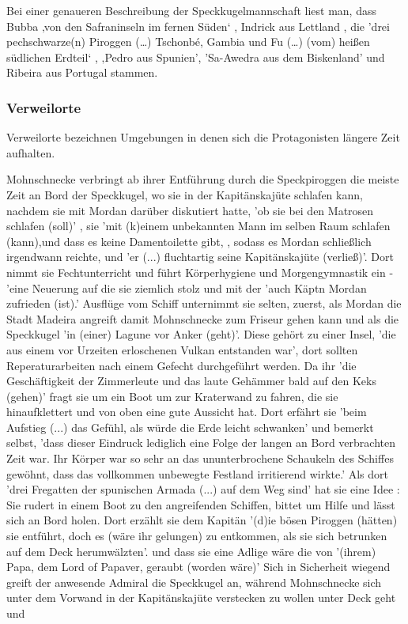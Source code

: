 Bei einer genaueren Beschreibung der Speckkugelmannschaft liest man, dass Bubba ‚von den Safraninseln im fernen Süden‘ \cite[S.46]{pir}, Indrick aus Lettland \cite[S.46f]{pir}, die 'drei pechschwarze(n) Piroggen (…) Tschonbé, Gambia und Fu (…) (vom) heißen südlichen Erdteil‘ \cite[S.47]{pir}, ‚Pedro aus Spunien'\cite[S.47]{pir}, 'Sa-Awedra aus dem Biskenland' \cite[S.47]{pir} und Ribeira aus Portugal \cite[S.47]{pir} stammen.


\subsubsection{Verweilorte}
Verweilorte bezeichnen Umgebungen in denen sich die Protagonisten längere Zeit aufhalten.

Mohnschnecke verbringt ab ihrer Entführung durch die Speckpiroggen \cite[S.32]{pir} die meiste Zeit an Bord der Speckkugel, wo sie in der Kapitänskajüte schlafen kann, nachdem sie mit Mordan darüber diskutiert hatte, 'ob sie bei den Matrosen schlafen (soll)' \cite[S.78]{pir}, sie 'mit (k)einem unbekannten Mann im selben Raum schlafen (kann),\cite[S.78]{pir}und dass es keine Damentoilette gibt, \cite[S.78]{pir}, sodass es Mordan schließlich irgendwann reichte, \cite[S.78]{pir} und 'er (...) fluchtartig seine Kapitänskajüte (verließ)'.\cite[S.78]{pir} Dort nimmt sie Fechtunterricht \cite[S.127f]{pir} und führt Körperhygiene und Morgengymnastik ein - 'eine Neuerung auf die sie ziemlich stolz \cite[S.181]{pir} und mit der 'auch Käptn Mordan zufrieden (ist).'\cite[S.181]{pir} Ausflüge vom Schiff unternimmt sie selten, zuerst, als Mordan die Stadt Madeira angreift \cite[S.186ff]{pir} damit Mohnschnecke zum Friseur gehen kann \cite[S.195]{pir} und als die Speckkugel 'in (einer) Lagune vor Anker (geht)'.\cite[S.247]{pir} Diese gehört zu einer Insel, 'die aus einem vor Urzeiten erloschenen Vulkan entstanden war',\cite[S.246]{pir} dort sollten Reperaturarbeiten nach einem Gefecht durchgeführt werden.\cite[S.245f]{pir} Da ihr 'die Geschäftigkeit der Zimmerleute und das laute Gehämmer bald auf den Keks (gehen)'\cite[S.247]{pir} fragt sie um ein Boot um zur Kraterwand zu fahren, die sie hinaufklettert und von oben eine gute Aussicht hat. \cite[S.247f]{pir} Dort erfährt sie 'beim Aufstieg (...) das Gefühl, als würde die Erde leicht schwanken'\cite[S.248]{pir} und bemerkt selbst, 'dass dieser Eindruck lediglich eine Folge der langen an Bord verbrachten Zeit war. Ihr Körper war so sehr an das ununterbrochene Schaukeln des Schiffes gewöhnt, dass das vollkommen unbewegte Festland irritierend wirkte.'\cite[S.248]{pir} Als dort 'drei Fregatten der spunischen Armada (...) auf dem Weg sind'\cite[S.250]{pir} hat sie eine Idee \cite[S.251]{pir}: Sie rudert in einem Boot zu den angreifenden Schiffen, bittet um Hilfe und lässt sich an Bord holen. Dort erzählt sie dem Kapitän '(d)ie bösen Piroggen (hätten) sie entführt, doch es (wäre ihr gelungen) zu entkommen, als sie sich betrunken auf dem Deck herumwälzten'.\cite[S.254]{pir} und dass sie eine Adlige wäre die von '(ihrem) Papa, dem Lord of Papaver, geraubt (worden wäre)'\cite[S.255]{pir} Sich in Sicherheit wiegend greift der anwesende Admiral die Speckkugel an, während Mohnschnecke sich unter dem Vorwand in der Kapitänskajüte verstecken zu wollen unter Deck geht und 